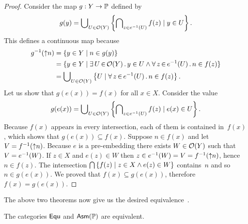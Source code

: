 \begin{proof}
  Consider the map $g : Y \to \mathbb{P}$ defined by
  \begin{equation*}
    g(y) = \bigcup\nolimits_{U \in \mathcal{O}(Y)} \left\{
      \bigcap\nolimits_{z \in {e}^{-1}(U)} f(z)
      \mid
      y \in U
    \right\}.
  \end{equation*}
  This defines a continuous map because
  \begin{align*}
    \invim{g}(\upper{n}) &=
    \set{y \in Y \such n \in g(y)} \\
    &=
    \set{y \in Y \such \xsome{U}{
        \topol{Y}}{y \in U \land
        \xall{z}{\invim{e}(U)}{n \in f(z)}
      }
    } \\
    &=
    \tbigcup_{U \in \topol{Y}} \left\{
        U \such
        \xall{z}{\invim{e}(U)}{n \in f(z)}
      \right\}.
  \end{align*}
  Let us show that $g(e(x)) = f(x)$ for all $x \in X$. Consider the
  value
  \begin{align*}
    g(e(x)) =
    \bigcup\nolimits_{U \in \mathcal{O}(Y)} \left\{
      \bigcap\nolimits_{z \in {e}^{-1}(U)} f(z)
      \mid
      e(x) \in U \right\}.
  \end{align*}
  Because $f(x)$ appears in every intersection, each of them is
  contained in~$f(x)$, which shows that $g(e(x)) \subseteq f(x)$.
  Suppose $n \in f(x)$ and let $V = {f}^{-1}({\uparrow}n)$. Because $e$
  is a pre-embedding there exists $W \in \mathcal{O}(Y)$ such that $V =
  {e}^{-1}(W)$. If $z \in X$ and $e(z) \in W$ then $z \in
  {e}^{-1}(W) = V = {f}^{-1}({\uparrow}n)$, hence $n \in f(z)$. The
  intersection $\bigcap\nolimits \left\{f(z) \mid z \in X \land e(z) \in W
  \right\}$ contains~$n$ and so $n \in g(e(x))$. We proved that $f(x)
  \subseteq g(e(x))$, therefore $f(x) = g(e(x))$.
\end{proof}

The above two theorems now give us the desired
equivalence~\cite{Simpson-Menni}.

\begin{proposition}
  The categories $\mathsf{Equ}$ and $\mathsf{Asm}(\mathbb{P})$ are equivalent.
\end{proposition}

